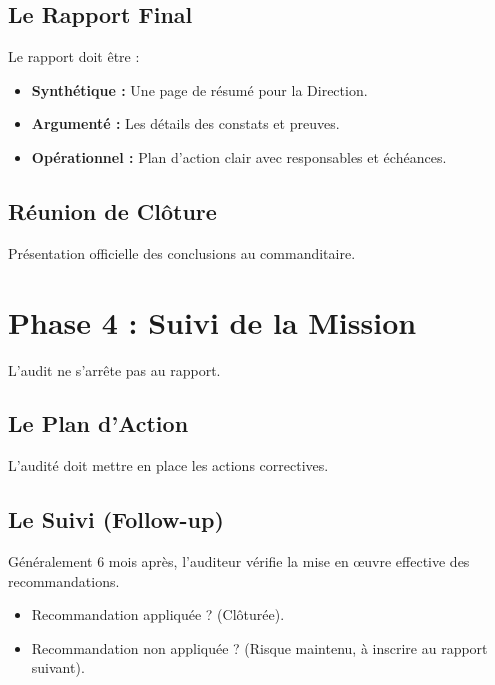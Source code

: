 \subsection{Le Rapport Final}

Le rapport doit être :
\begin{itemize}
    \item \textbf{Synthétique :} Une page de résumé pour la Direction.
    \item \textbf{Argumenté :} Les détails des constats et preuves.
    \item \textbf{Opérationnel :} Plan d'action clair avec responsables et échéances.
\end{itemize}

\subsection{Réunion de Clôture}

Présentation officielle des conclusions au commanditaire.

\section{Phase 4 : Suivi de la Mission}

L'audit ne s'arrête pas au rapport.

\subsection{Le Plan d'Action}

L'audité doit mettre en place les actions correctives.

\subsection{Le Suivi (Follow-up)}

Généralement 6 mois après, l'auditeur vérifie la mise en œuvre effective des recommandations.
\begin{itemize}
    \item Recommandation appliquée ? (Clôturée).
    \item Recommandation non appliquée ? (Risque maintenu, à inscrire au rapport suivant).
\end{itemize}

